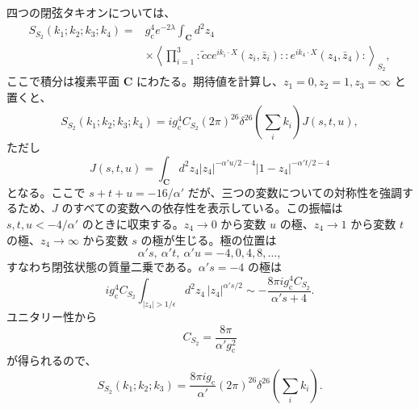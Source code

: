 四つの閉弦タキオンについては、
\begin{equation}
\begin{aligned}
S_{S_2}(k_1;k_2;k_3;k_4)
={}&g_{\mathrm c}^4e^{-2\lambda}\int_{\mathbf C}d^2z_4\\
&\times\left\langle
\prod_{i=1}^{3}:\widetilde c c e^{ik_i\cdot X}(z_i,\bar z_i):
:e^{ik_4\cdot X}(z_4,\bar z_4):
\right\rangle_{S_2},
\end{aligned}
\tag{6.6.3}\label{eq:6.6.3}
\end{equation}
ここで積分は複素平面 $\mathbf C$ にわたる。期待値を計算し、$z_1=0,z_2=1,z_3=\infty$ と置くと、
\begin{equation}
S_{S_2}(k_1;k_2;k_3;k_4)
=ig_{\mathrm c}^4C_{S_2}(2\pi)^{26}
\delta^{26}\left(\sum_i k_i\right)J(s,t,u),
\tag{6.6.4}\label{eq:6.6.4}
\end{equation}
ただし
\begin{equation}
J(s,t,u)=\int_{\mathbf C}d^2z_4
|z_4|^{-\alpha'u/2-4}|1-z_4|^{-\alpha't/2-4}
\tag{6.6.5}\label{eq:6.6.5}
\end{equation}
となる。ここで $s+t+u=-16/\alpha'$ だが、三つの変数についての対称性を強調するため、$J$ のすべての変数への依存性を表示している。この振幅は $s,t,u<-4/\alpha'$ のときに収束する。$z_4\to0$ から変数 $u$ の極、$z_4\to1$ から変数 $t$ の極、$z_4\to\infty$ から変数 $s$ の極が生じる。極の位置は
\begin{equation}
\alpha's,\ \alpha't,\ \alpha'u=-4,0,4,8,\ldots,
\tag{6.6.6}\label{eq:6.6.6}
\end{equation}
すなわち閉弦状態の質量二乗である。$\alpha's=-4$ の極は
\begin{equation}
ig_{\mathrm c}^4C_{S_2}
\int_{|z_4|>1/\epsilon}d^2z_4\,|z_4|^{\alpha's/2}
\sim-\frac{8\pi ig_{\mathrm c}^4C_{S_2}}{\alpha's+4}.
\tag{6.6.7}\label{eq:6.6.7}
\end{equation}
ユニタリー性から
\begin{equation}
C_{S_2}=\frac{8\pi}{\alpha'g_{\mathrm c}^2}
\tag{6.6.8}\label{eq:6.6.8}
\end{equation}
が得られるので、
\begin{equation}
S_{S_2}(k_1;k_2;k_3)=\frac{8\pi ig_{\mathrm c}}{\alpha'}
(2\pi)^{26}\delta^{26}\left(\sum_i k_i\right).
\tag{6.6.9}\label{eq:6.6.9}
\end{equation}

